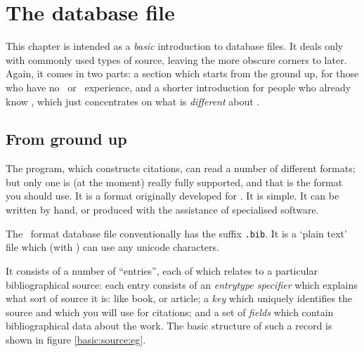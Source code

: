 \chapter{The database file}

This chapter is intended as a \emph{basic} introduction to database files. It deals only with commonly used types of source, leaving the more obscure corners to later. Again, it comes in two parts: a section which starts from the ground up, for those who have no \bibtex\ or \biblatex\ experience, and a shorter introduction for people who already know \bibtex, which just concentrates on what is \emph{different} about \biblatex.

\section{From ground up}

The  program, which constructs citations, can read a number of different formats; but only one is (at the moment) really fully supported, and that is the format you should use. It is a format originally developed for \bibtex. It is simple. It can be written by hand, or produced with the assistance of specialised software.

The \bibtex\ format database file conventionally has the suffix \verb|.bib|. It is a `plain text' file which (with ) can use any unicode characters.

It consists of a number of ``entries'', each of which relates to a particular bibliographical source: each entry consists of an \emph{entrytype specifier} which explains what sort of source it is: like book, or article; a \emph{key} which uniquely identifies the source and which you will use for citations; and a set of \emph{fields} which contain bibliographical data about the work. The basic structure of such a record is shown in figure \ref{basic:source:eg}.

